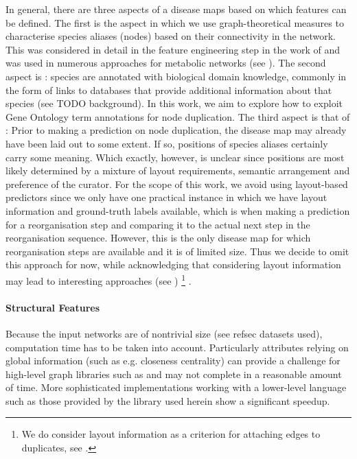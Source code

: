 \documentclass[
	fontsize=10pt, %
	twoside=false, %
	secnumdepth=1, %
]{kaobook}
\begin{document}
In general, there are three aspects of a disease maps based on which features
can be defined. The first is the  aspect in which we use
graph-theoretical measures to characterise species aliases (nodes) based on
their connectivity in the network.
This was considered in detail in the feature
engineering step in the work of
\citeauthor{nielsen_MachineLearningSupport_2019} and was used in numerous
approaches for metabolic networks (see ).
%
The second aspect is : species are annotated with biological
domain knowledge, commonly in the form of links to databases that provide
additional information about that species (see TODO background). In this work,
we aim to explore how to exploit Gene Ontology term annotations for node duplication.
%
The third aspect is that of : Prior to making a prediction on node
duplication, the disease map may already have been laid out to some extent.
If so, positions of species aliases certainly carry some meaning. Which exactly,
however, is unclear since positions are most likely determined by a mixture of
layout requirements, semantic arrangement and preference of the curator.
%
For the scope of this work, we avoid using layout-based predictors
since we only have one practical instance in which we have layout information
and ground-truth labels available, which is when making a prediction for a
 reorganisation step and comparing it to the actual next
step in the reorganisation sequence. However, this is the only disease map for
which reorganisation steps are available and it is of limited size. Thus we
decide to omit this approach for now, while acknowledging that
considering layout information may lead to interesting approaches (see )
\footnote{
  We do consider layout information as a criterion for attaching edges to
  duplicates, see .
}
.



\paragraph{Structural Features} 
Because the input networks are of nontrivial size (see refsec datasets used),
computation time has to be taken into account.
% 
Particularly attributes relying on global information (such as e.g. closeness
centrality) can provide a challenge for high-level graph libraries such as
 and may not complete in a reasonable amount of time. More
sophisticated implementations working with a lower-level language such as those
provided by the  library used herein show a significant speedup.
\end{document}
